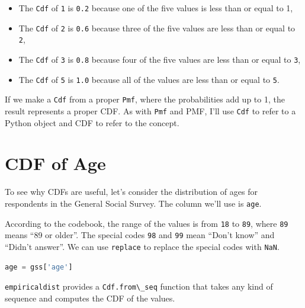 \documentclass[
]{book}
\newcommand{\passthrough}[1]{#1}
\begin{document}
\begin{itemize}
\item
  The \passthrough{\lstinline!Cdf!} of \passthrough{\lstinline!1!} is
  \passthrough{\lstinline!0.2!} because one of the five values is less
  than or equal to 1,
\item
  The \passthrough{\lstinline!Cdf!} of \passthrough{\lstinline!2!} is
  \passthrough{\lstinline!0.6!} because three of the five values are
  less than or equal to \passthrough{\lstinline!2!},
\item
  The \passthrough{\lstinline!Cdf!} of \passthrough{\lstinline!3!} is
  \passthrough{\lstinline!0.8!} because four of the five values are less
  than or equal to \passthrough{\lstinline!3!},
\item
  The \passthrough{\lstinline!Cdf!} of \passthrough{\lstinline!5!} is
  \passthrough{\lstinline!1.0!} because all of the values are less than
  or equal to \passthrough{\lstinline!5!}.
\end{itemize}

If we make a \passthrough{\lstinline!Cdf!} from a proper
\passthrough{\lstinline!Pmf!}, where the probabilities add up to 1, the
result represents a proper CDF. As with \passthrough{\lstinline!Pmf!}
and PMF, I'll use \passthrough{\lstinline!Cdf!} to refer to a Python
object and CDF to refer to the concept.

\section{CDF of Age}\label{cdf-of-age}

To see why CDFs are useful, let's consider the distribution of ages for
respondents in the General Social Survey. The column we'll use is
\passthrough{\lstinline!age!}.

According to the codebook, the range of the values is from
\passthrough{\lstinline!18!} to \passthrough{\lstinline!89!}, where
\passthrough{\lstinline!89!} means ``89 or older''. The special codes
\passthrough{\lstinline!98!} and \passthrough{\lstinline!99!} mean
``Don't know'' and ``Didn't answer''. We can use
\passthrough{\lstinline!replace!} to replace the special codes with
\passthrough{\lstinline!NaN!}.

\begin{lstlisting}[language=Python]
age = gss['age']
\end{lstlisting}

\passthrough{\lstinline!empiricaldist!} provides a
\passthrough{\lstinline!Cdf.from\_seq!} function that takes any kind of
sequence and computes the CDF of the values.
\end{document}
